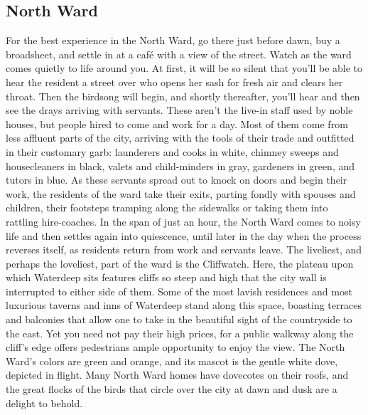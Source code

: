 \documentclass[10pt,a4paper,twoside,twocolumn,openany,nodeprecatedcode]{dndbook}
\begin{document}
\subsection{North Ward}
For the best experience in the North Ward, go there just before dawn, buy a broadsheet, and settle in at a café with a view of the street. Watch as the ward comes quietly to life around you. At first, it will be so silent that you'll be able to hear the resident a street over who opens her sash for fresh air and clears her throat. Then the birdsong will begin, and shortly thereafter, you'll hear and then see the drays arriving with servants. These aren't the live-in staff used by noble houses, but people hired to come and work for a day. Most of them come from less affluent parts of the city, arriving with the tools of their trade and outfitted in their customary garb: launderers and cooks in white, chimney sweeps and housecleaners in black, valets and child-minders in gray, gardeners in green, and tutors in blue.
As these servants spread out to knock on doors and begin their work, the residents of the ward take their exits, parting fondly with spouses and children, their footsteps tramping along the sidewalks or taking them into rattling hire-coaches. In the span of just an hour, the North Ward comes to noisy life and then settles again into quiescence, until later in the day when the process reverses itself, as residents return from work and servants leave.
The liveliest, and perhaps the loveliest, part of the ward is the Cliffwatch. Here, the plateau upon which Waterdeep sits features cliffs so steep and high that the city wall is interrupted to either side of them. Some of the most lavish residences and most luxurious taverns and inns of Waterdeep stand along this space, boasting terraces and balconies that allow one to take in the beautiful sight of the countryside to the east. Yet you need not pay their high prices, for a public walkway along the cliff's edge offers pedestrians ample opportunity to enjoy the view.
The North Ward's colors are green and orange, and its mascot is the gentle white dove, depicted in flight. Many North Ward homes have dovecotes on their roofs, and the great flocks of the birds that circle over the city at dawn and dusk are a delight to behold.
\end{document}
